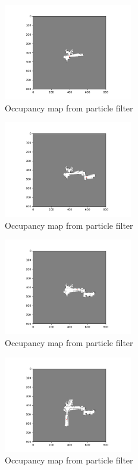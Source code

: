 \documentclass[a4paper]{article}
\begin{document}
\begin{figure}[h]
    \centering
    \includegraphics[width=0.5\textwidth]{map800.png}
    \caption{Occupancy map from particle filter}
    \label{fig:particle_filter}
\end{figure}
\begin{figure}[h]
    \centering
    \includegraphics[width=0.5\textwidth]{map1600.png}
    \caption{Occupancy map from particle filter}
    \label{fig:particle_filter}
\end{figure}
\begin{figure}[h]
    \centering
    \includegraphics[width=0.5\textwidth]{map2400.png}
    \caption{Occupancy map from particle filter}
    \label{fig:particle_filter}
\end{figure}
\begin{figure}[h]
    \centering
    \includegraphics[width=0.5\textwidth]{map3200.png}
    \caption{Occupancy map from particle filter}
    \label{fig:particle_filter}
\end{figure}
\end{document}
